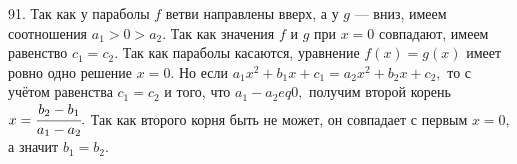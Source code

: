 91. Так как у параболы $f$ ветви направлены вверх, а у $g$ --- вниз, имеем соотношения $a_1>0>a_2.$ Так как значения $f$ и $g$ при $x=0$ совпадают, имеем равенство $c_1=c_2.$ Так как параболы касаются, уравнение $f(x)=g(x)$ имеет ровно одно решение $x=0.$ Но если $a_1x^2+b_1x+c_1=a_2x^2+b_2x+c_2,$ то с учётом равенства $c_1=c_2$ и того, что $a_1-a_2
eq0,$ получим второй корень $x=\cfrac{b_2-b_1}{a_1-a_2}.$ Так как второго корня быть не может, он совпадает с первым $x=0,$ а значит $b_1=b_2.$\\
